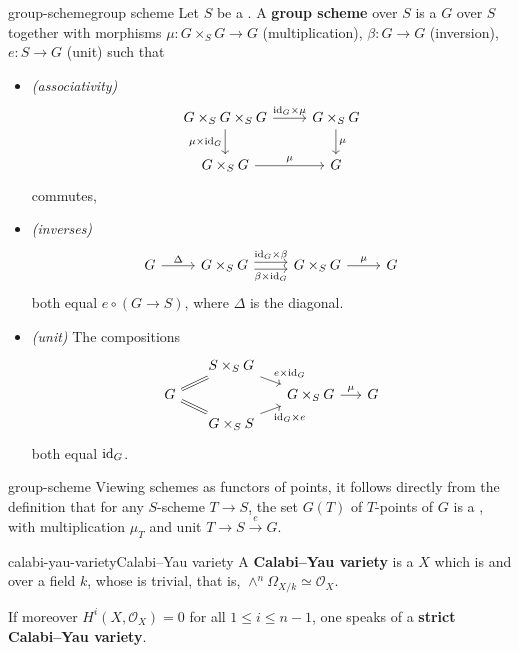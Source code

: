 \begin{topic}{group-scheme}{group scheme}
    Let $S$ be a . A \textbf{group scheme} over $S$ is a  $G$ over $S$ together with morphisms $\mu : G \times_S G \to G$ (multiplication), $\beta : G \to G$ (inversion), $e : S \to G$ (unit) such that
    \begin{itemize}
        \item \textit{(associativity)}
        \[ \begin{tikzcd}
            G \times_S G \times_S G \arrow{r}{\id_G \times \mu} \arrow[swap]{d}{\mu \times \id_G} & G \times_S G \arrow{d}{\mu} \\ G \times_S G \arrow{r}{\mu} & G
        \end{tikzcd} \]
        commutes,
        \item \textit{(inverses)}
        \[ \begin{tikzcd} G \arrow{r}{\Delta} & G \times_S G \arrow[shift left=0.25em]{r}{\id_G \times \beta} \arrow[swap, shift right=0.25em]{r}{\beta \times \id_G} & G \times_S G \arrow{r}{\mu} & G \end{tikzcd} \]
        both equal $e \circ (G \to S)$, where $\Delta$ is the diagonal.
        \item \textit{(unit)} The compositions
        \[ \begin{tikzcd}[row sep=0.5em, column sep=1.5em] & S \times_S G \arrow{dr}{e \times \id_G} & & \\ G \arrow[equal]{ur} \arrow[equal]{dr} & & G \times_S G \arrow{r}{\mu} & G \\ & G \times_S S \arrow[swap]{ur}{\id_G \times e} & & \end{tikzcd} \]
        both equal $\text{id}_G$.
    \end{itemize}
\end{topic}

\begin{example}{group-scheme}
    Viewing schemes as functors of points, it follows directly from the definition that for any $S$-scheme $T \to S$, the set $G(T)$ of $T$-points of $G$ is a , with multiplication $\mu_T$ and unit $T \to S \xrightarrow{e} G$.
\end{example}

\begin{topic}{calabi-yau-variety}{Calabi--Yau variety}
    A \textbf{Calabi--Yau variety} is a  $X$ which is  and  over a field $k$, whose  is trivial, that is, $\wedge^n \Omega_{X/k} \simeq \mathcal{O}_X$.
    
    If moreover $H^i(X, \mathcal{O}_X) = 0$ for all $1 \le i \le n - 1$, one speaks of a \textbf{strict Calabi--Yau variety}.
\end{topic}

